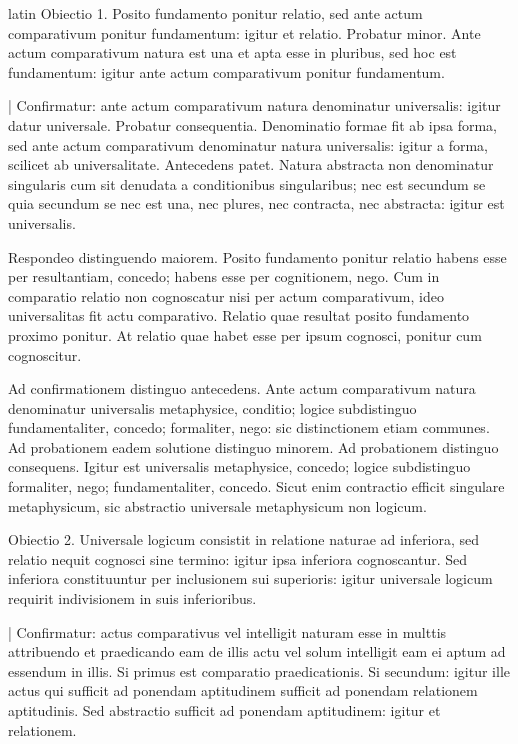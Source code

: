 \begin{otherlanguage*}{latin}
\pstart
  Obiectio 1. Posito fundamento ponitur relatio, sed ante actum comparativum ponitur fundamentum: igitur et relatio. Probatur minor. Ante actum comparativum natura est una et apta esse in pluribus, sed hoc est fundamentum: igitur ante actum comparativum ponitur fundamentum. 
\pend

\pstart
  \textnormal{|} Confirmatur: ante actum comparativum natura denominatur universalis: igitur datur universale. Probatur consequentia. Denominatio formae fit ab ipsa forma, sed ante actum comparativum denominatur natura universalis: igitur a forma, scilicet ab universalitate. Antecedens patet. Natura abstracta non denominatur singularis cum sit denudata a conditionibus singularibus; nec est secundum se quia secundum se nec est una, nec plures, nec contracta, nec abstracta: igitur est universalis. 
\pend

\pstart
  Respondeo distinguendo maiorem. Posito fundamento ponitur relatio habens esse per resultantiam, concedo; habens esse per cognitionem, nego. Cum in comparatio relatio non cognoscatur nisi per actum comparativum, ideo universalitas fit actu comparativo. Relatio quae resultat posito fundamento proximo ponitur. At relatio quae habet esse per ipsum cognosci, ponitur cum cognoscitur. 
\pend

\pstart
  Ad confirmationem distinguo antecedens. Ante actum comparativum natura denominatur universalis metaphysice, conditio; logice subdistinguo fundamentaliter, concedo; formaliter, nego: sic distinctionem etiam communes. Ad probationem eadem solutione distinguo minorem. Ad probationem distinguo consequens. Igitur est universalis metaphysice, concedo; logice subdistinguo formaliter, nego; fundamentaliter, concedo. Sicut enim contractio efficit singulare metaphysicum, sic abstractio universale metaphysicum non logicum. 
\pend

\pstart
  Obiectio 2. Universale logicum consistit in relatione naturae ad inferiora, sed relatio nequit cognosci sine termino: igitur ipsa inferiora cognoscantur. Sed inferiora constituuntur per inclusionem sui superioris: igitur universale logicum requirit indivisionem in suis inferioribus. 
\pend

\pstart
 \textnormal{|}  Confirmatur: actus comparativus vel intelligit naturam esse in multtis attribuendo et praedicando eam de illis actu vel solum intelligit eam ei aptum ad essendum in illis. Si primus est comparatio praedicationis. Si secundum: igitur ille actus qui sufficit ad ponendam aptitudinem sufficit ad ponendam relationem aptitudinis. Sed abstractio sufficit ad ponendam aptitudinem: igitur et relationem. 
\pend


\end{otherlanguage*}
